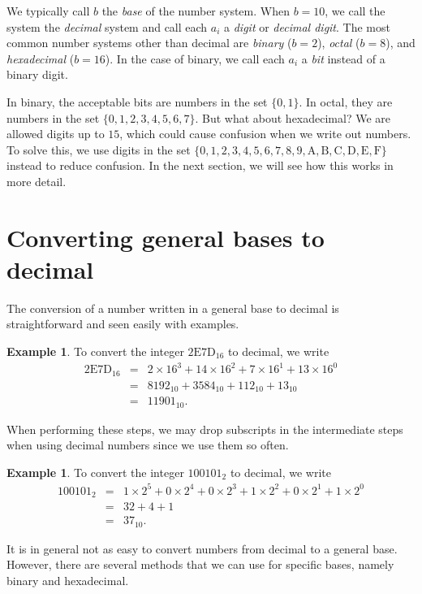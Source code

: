 \documentclass{book}
\theoremstyle{plain}
\theoremstyle{definition}
\newtheorem{example}[theorem]{Example}
\begin{document}
We typically call $b$ the {\it base} of the number system. When $b = 10$, we call the system the {\it decimal} system and call each $a_i$ a {\it digit} or {\it decimal digit}. The most common number systems other than decimal are {\it binary} ($b = 2$), {\it octal} ($b = 8$), and {\it hexadecimal} ($b = 16$). In the case of binary, we call each $a_i$ a {\it bit} instead of a binary digit.

In binary, the acceptable bits are numbers in the set $\{0,1\}$. In octal, they are numbers in the set $\{0,1,2,3,4,5,6,7\}$. But what about hexadecimal? We are allowed digits up to $15$, which could cause confusion when we write out numbers. To solve this, we use digits in the set $\{0,1,2,3,4,5,6,7,8,9,\text{A},\text{B},\text{C},\text{D},\text{E},\text{F}\}$ instead to reduce confusion. In the next section, we will see how this works in more detail.

\section{Converting general bases to decimal}
The conversion of a number written in a general base to decimal is straightforward and seen easily with examples.

\begin{example}
To convert the integer $2\text{E}7\text{D}_{16}$ to decimal, we write
\begin{eqnarray*}
2\text{E}7\text{D}_{16} &=& 2 \times 16^3 + 14 \times 16^2 + 7 \times 16^1 + 13 \times 16^0 \\
&=& 8192_{10} + 3584_{10} + 112_{10} + 13_{10} \\
&=& 11901_{10}.
\end{eqnarray*}
\end{example}

When performing these steps, we may drop subscripts in the intermediate steps when using decimal numbers since we use them so often.

\begin{example}
To convert the integer $100101_2$ to decimal, we write
\begin{eqnarray*}
100101_2 &=& 1 \times 2^5 + 0 \times 2^4 + 0 \times 2^3 + 1 \times 2^2 + 0 \times 2^1 + 1 \times 2^0 \\
&=& 32 + 4 + 1 \\
&=& 37_{10}.
\end{eqnarray*}
\end{example}

It is in general not as easy to convert numbers from decimal to a general base. However, there are several methods that we can use for specific bases, namely binary and hexadecimal.
\end{document}
